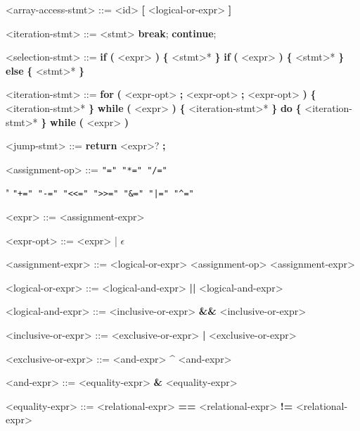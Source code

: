 \documentclass{article}
\begin{document}
\begin{grammar}
            <array-access-stmt> ::= <id> \textbf{[} <logical-or-expr> \textbf{]}

            <iteration-stmt> ::= <stmt>
            \alt \textbf{break};
            \alt \textbf{continue};

            <selection-stmt> ::= \textbf{if} \textbf{(} <expr> \textbf{)} \textbf{\{} <stmt>* \textbf{\}}
            \alt \textbf{if} \textbf{(} <expr> \textbf{)} \textbf{\{} <stmt>* \textbf{\}} \textbf{else} \textbf{\{} <stmt>* \textbf{\}}

            <iteration-stmt> ::= \textbf{for} \textbf{(} <expr-opt> \textbf{;} <expr-opt> \textbf{;} <expr-opt> \textbf{)} \textbf{\{} <iteration-stmt>* \textbf{\}}
            \alt \textbf{while} \textbf{(} <expr> \textbf{)} \textbf{\{} <iteration-stmt>* \textbf{\}}
            \alt \textbf{do} \textbf{\{} <iteration-stmt>* \textbf{\}} \textbf{while} \textbf{(} <expr> \textbf{)} 

            <jump-stmt> ::= \textbf{return} <expr>? \textbf{;}

            <assignment-op> ::= \tt{"="}
            \alt \tt{"*="}
            \alt \tt{"/="}
            \alt \tt{"%
            \alt \tt{"+="}
            \alt \tt{"-="}
            \alt \tt{"<<="}
            \alt \tt{">>="}
            \alt \tt{"&="}
            \alt \tt{"|="}
            \alt \tt{"^="}

            <expr> ::= <assignment-expr>

            <expr-opt> ::= <expr> | $\epsilon$

            <assignment-expr> ::= <logical-or-expr>
             <assignment-op> <assignment-expr>

            <logical-or-expr> ::= <logical-and-expr>
             \textbf{||} <logical-and-expr>

            <logical-and-expr> ::= <inclusive-or-expr>
             \textbf{\&\&} <inclusive-or-expr>

            <inclusive-or-expr> ::= <exclusive-or-expr>
             \textbf{|} <exclusive-or-expr>

            <exclusive-or-expr> ::= <and-expr>
             \textbf{\^} <and-expr>

            <and-expr> ::= <equality-expr>
             \textbf{\&} <equality-expr>

            <equality-expr> ::= <relational-expr>
             \textbf{==} <relational-expr>
             \textbf{!=} <relational-expr>

}
\end{grammar}
\end{document}
